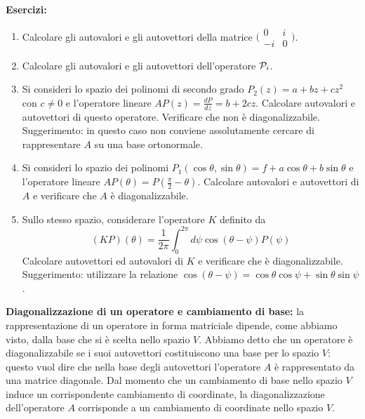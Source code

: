 \documentclass[a4paper,10pt]{article}
\newcommand{\linea}{\vskip14pt \noindent}
\begin{document}
\newpage

\linea
{\bf Esercizi:}
\begin{enumerate}
\item Calcolare gli autovalori e gli autovettori della matrice 
$ \bigl(\begin{smallmatrix} 0 & i \\ -i & 0 \end{smallmatrix} \bigr)$.
\item Calcolare gli autovalori e gli autovettori dell'operatore ${\cal P}_i$.
\item Si consideri lo spazio dei polinomi di secondo grado $P_2(z)=a+bz+cz^2$ con $c\neq 0$  e l'operatore lineare 
$A P(z) = \frac{dP}{dz} = b + 2cz$. Calcolare autovalori e autovettori di questo operatore.
Verificare che non \`e diagonalizzabile. Suggerimento: in questo caso non conviene assolutamente cercare
di rappresentare $A$ su una base ortonormale. 
\item Si consideri lo spazio dei polinomi $P_1(\cos \theta,\sin \theta)=f + a \cos\theta + b\sin\theta$ e
l'operatore lineare $A P(\theta)=P(\frac{\pi}{2}-\theta)$. Calcolare autovalori e autovettori di $A$ e
verificare che $A$ \`e diagonalizzabile.
\item Sullo stesso spazio, considerare l'operatore $K$ definito da 
\begin{equation} \nonumber
(KP)(\theta)=\frac{1}{2\pi}\int_0^{2\pi} d\psi \cos(\theta-\psi) P(\psi)
\end{equation}
Calcolare autovettori ed autovalori di $K$ e verificare che \`e diagonalizzabile. \\
Suggerimento: utilizzare la relazione $\cos (\theta - \psi)= \cos \theta \cos \psi + \sin \theta \sin \psi$.
\end{enumerate}

\linea
{\bf Diagonalizzazione di un operatore e cambiamento di base:} la rappresentazione di un operatore in forma
matriciale dipende, come abbiamo visto, dalla base che si \`e scelta nello spazio $V$.
Abbiamo detto che un operatore \`e diagonalizzabile se i suoi autovettori costituiscono una base per lo
spazio $V$: questo vuol dire che nella base degli autovettori l'operatore $A$ \`e rappresentato da una
matrice diagonale. Dal momento che un cambiamento di base nello spazio $V$ induce un corrispondente
cambiamento di coordinate, la diagonalizzazione dell'operatore $A$ corrisponde a un cambiamento di
coordinate nello spazio $V$.
\end{document}
